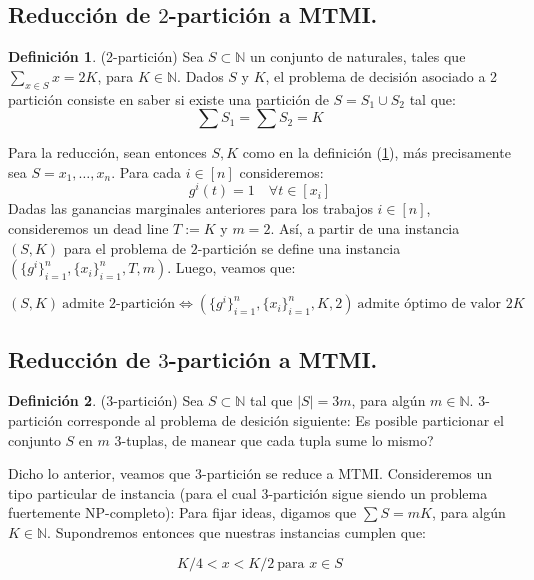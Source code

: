 \documentclass[10pt]{article}
\newcommand{\N}{\mathbb N}
\theoremstyle{plain}
\theoremstyle{definition}
\newtheorem{defi}{Definición}
\begin{document}
\subsection{Reducción de $2$-partición a MTMI.}
\begin{defi}(2-partición)
\label{def:2part}
Sea $S \subset \N$ un conjunto de naturales, tales que $\sum_{x \in S} x = 2 K$, para $K \in \N$. Dados $S$ y $K$, el problema de decisión asociado a 2 partición consiste en saber si existe una partición de $S = S_1 \cup S_2$ tal que:
$$
\sum S_1 = \sum S_2 = K
$$
\end{defi}

Para la reducción, sean entonces $S, K$ como en la definición (\ref{def:2part}), más precisamente sea $S = {x_1, \ldots, x_n}$. Para cada $i \in [n]$ consideremos:
\begin{equation}
\label{eq:red}
g^i(t) = 1 \quad \forall t \in [x_i]
\end{equation}
Dadas las ganancias marginales anteriores para los trabajos $i \in [n]$, consideremos un dead line $T:= K$ y $m = 2$. Así, a partir de una instancia $(S, K)$ para el problema de $2$-partición se define una instancia $(\{g^i\}_{i=1}^n,\{x_i\}_{i=1}^n, T, m)$. Luego, veamos que:

\begin{equation}
\label{eq:red2part}
(S, K)\ \text{admite $2$-partición} \Longleftrightarrow (\{g^i\}_{i=1}^n,\{x_i\}_{i=1}^n, K, 2)\  \text{admite óptimo de valor } 2K
\end{equation}


\subsection{Reducción de $3$-partición a MTMI.}
\begin{defi}{(3-partición)}
Sea $S\subset \N$ tal que $|S| = 3m$, para algún $m \in \N$. $3$-partición corresponde al problema de desición siguiente: Es posible particionar el conjunto $S$ en $m$ $3$-tuplas, de manear que cada tupla sume lo mismo?
\end{defi}

Dicho lo anterior, veamos que $3$-partición se reduce a MTMI. Consideremos un tipo particular de instancia (para el cual $3$-partición sigue siendo un problema fuertemente NP-completo): Para fijar ideas, digamos que $\sum S = m K$, para algún $K \in \N$. Supondremos entonces que nuestras instancias cumplen que:

\begin{equation}
\label{eq:inst}
K/4 < x < K/2\  \text{para } x \in S
\end{equation}
\end{document}
